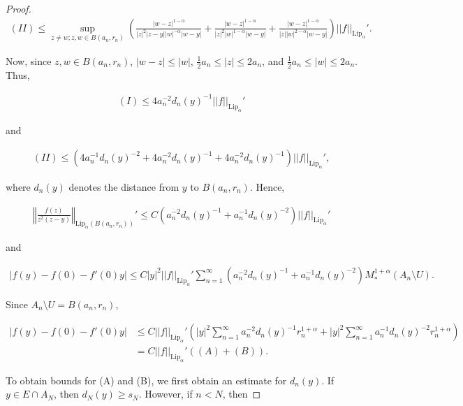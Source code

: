 \documentclass{article}
\theoremstyle{definition}
\begin{document}
\begin{proof}
\begin{align*}
    (II) \leq \sup_{z \neq w; z,w \in B(a_n,r_n)} \left( \frac{|w-z|^{1-\alpha}}{|z|^2|z-y||w|^{-\alpha}|w-y|} + \frac{|w-z|^{1-\alpha}}{|z|^2|w|^{1-\alpha}|w-y|} + \frac{|w-z|^{1-\alpha}}{|z||w|^{2-\alpha}|w-y|} \right) ||f||_{\text{Lip}_{\alpha} }'.
\end{align*}


\noindent Now, since $z,w \in B(a_n,r_n)$, $|w-z| \leq |w|$, $\frac{1}{2} a_n \leq |z| \leq 2 a_n$, and $\frac{1}{2} a_n \leq |w| \leq 2 a_n$. Thus, 

\begin{align*}
    (I) \leq 4 a_n^{-2} d_n(y)^{-1} ||f||_{\text{Lip}_{\alpha} }'
\end{align*}

\noindent and

\begin{align*}
    (II) \leq \left( 4 a_n^{-1} d_n(y)^{-2} + 4 a_n^{-2} d_n(y)^{-1} + 4 a_n^{-2} d_n(y)^{-1}\right) ||f||_{\text{Lip}_{\alpha} }',
\end{align*}

\noindent where $d_n(y)$ denotes the distance from $y$ to $B(a_n, r_n)$. Hence,

\begin{align*}
    \left\Vert \frac{f(z)}{z^2(z-y)} \right\Vert_{\text{Lip}_{\alpha}(B(a_n,r_n))}' \leq C \left( a_n^{-2} d_n(y)^{-1} + a_n^{-1} d_n(y)^{-2} \right) ||f||_{\text{Lip}_{\alpha} }'
\end{align*}

\noindent and

\begin{align*}
    |f(y)-f(0) -f'(0)y| \leq C |y|^2 ||f||_{\text{Lip}_{\alpha} }' \sum_{n=1}^{\infty} \left( a_n^{-2} d_n(y)^{-1} + a_n^{-1} d_n(y)^{-2} \right) M_*^{1+\alpha}(A_n \setminus U).
\end{align*}

\noindent Since $A_n \setminus U = B(a_n, r_n)$,

\begin{align*}
    |f(y)-f(0) -f'(0)y| &\leq C ||f||_{\text{Lip}_{\alpha} }'\left( |y|^2\sum_{n=1}^{\infty}  a_n^{-2} d_n(y)^{-1} r_n^{1+ \alpha} + |y|^2\sum_{n=1}^{\infty}  a_n^{-1} d_n(y)^{-2}  r_n^{1+\alpha} \right)\\
    &= C ||f||_{\text{Lip}_{\alpha} }' \left( (A) + (B) \right).
\end{align*}



To obtain bounds for (A) and (B), we first obtain an estimate for $d_n(y)$. If $y \in E \cap A_N$, then $d_N(y) \geq s_N$. However, if $n < N$, then 


\end{proof}
\end{document}

